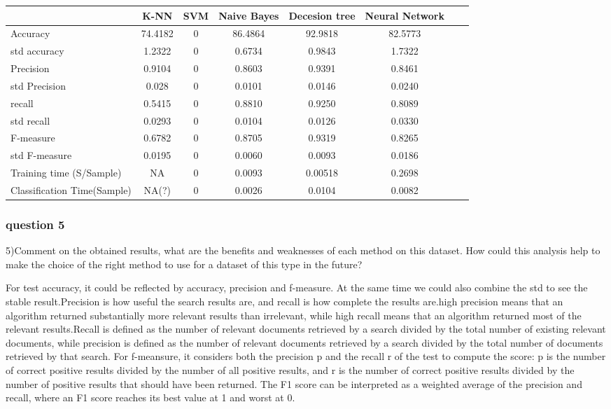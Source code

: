 \documentclass[]{article}
\begin{document}
\begin{tabular}
	{l*{6}{c}r}   	& K-NN  & SVM & Naive Bayes & Decesion tree & Neural Network \\ \hline
	Accuracy & 74.4182 & 0 & 86.4864 & 92.9818 & 82.5773 \\ 
	std accuracy & 1.2322 & 0 & 0.6734 & 0.9843 & 1.7322 \\
	Precision & 0.9104 & 0 & 0.8603 &0.9391 & 0.8461\\
	std Precision & 0.028 & 0 & 0.0101 & 0.0146 & 0.0240\\
	recall & 0.5415 & 0 & 0.8810 & 0.9250 & 0.8089\\
	std recall & 0.0293 & 0 & 0.0104 & 0.0126 & 0.0330\\
	F-measure & 0.6782 & 0 & 0.8705 & 0.9319 & 0.8265 \\
	std F-measure & 0.0195 & 0 & 0.0060 & 0.0093 & 0.0186 \\
	Training time (S/Sample) & NA & 0 & 0.0093 & 0.00518 & 0.2698 \\
	Classification Time(Sample) & NA(?) & 0 & 0.0026 & 0.0104 & 0.0082 \\
\end{tabular}

\subsubsection{question 5}
5)Comment on the obtained results, what are the benefits and weaknesses of each method on this dataset. How could this analysis help to make the choice of the right method to use for a dataset of this type in the future?

For test accuracy, it could be reflected by accuracy, precision and f-measure. At the same time we could also combine the std to see the stable result.Precision is how useful the search results are, and recall is how complete the results are.high precision means that an algorithm returned substantially more relevant results than irrelevant, while high recall means that an algorithm returned most of the relevant results.Recall is defined as the number of relevant documents retrieved by a search divided by the total number of existing relevant documents, while precision is defined as the number of relevant documents retrieved by a search divided by the total number of documents retrieved by that search. For f-meansure, it considers both the precision p and the recall r of the test to compute the score: p is the number of correct positive results divided by the number of all positive results, and r is the number of correct positive results divided by the number of positive results that should have been returned. The F1 score can be interpreted as a weighted average of the precision and recall, where an F1 score reaches its best value at 1 and worst at 0.
\end{document}
